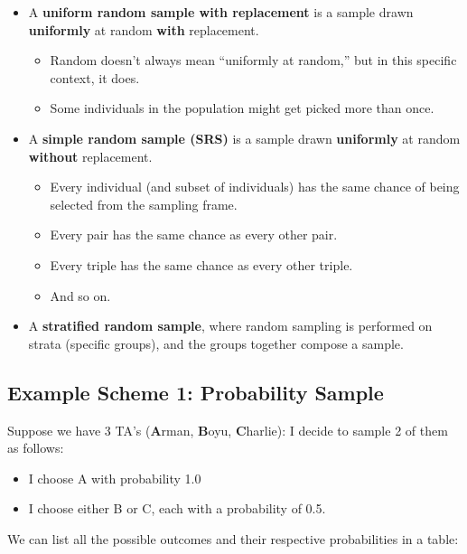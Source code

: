 \documentclass[
  letterpaper,
  DIV=11,
  numbers=noendperiod]{scrreprt}
\providecommand{\tightlist}{%
  \setlength{\itemsep}{0pt}\setlength{\parskip}{0pt}}\usepackage{longtable,booktabs,array}
\begin{document}
\begin{itemize}
\tightlist
\item
  A \textbf{uniform random sample with replacement} is a sample drawn
  \textbf{uniformly} at random \textbf{with} replacement.

  \begin{itemize}
  \tightlist
  \item
    Random doesn't always mean ``uniformly at random,'' but in this
    specific context, it does.
  \item
    Some individuals in the population might get picked more than once.
  \end{itemize}
\item
  A \textbf{simple random sample (SRS)} is a sample drawn
  \textbf{uniformly} at random \textbf{without} replacement.

  \begin{itemize}
  \tightlist
  \item
    Every individual (and subset of individuals) has the same chance of
    being selected from the sampling frame.
  \item
    Every pair has the same chance as every other pair.
  \item
    Every triple has the same chance as every other triple.
  \item
    And so on.
  \end{itemize}
\item
  A \textbf{stratified random sample}, where random sampling is
  performed on strata (specific groups), and the groups together compose
  a sample.
\end{itemize}

\subsection{Example Scheme 1: Probability
Sample}\label{example-scheme-1-probability-sample}

Suppose we have 3 TA's (\textbf{A}rman, \textbf{B}oyu,
\textbf{C}harlie): I decide to sample 2 of them as follows:

\begin{itemize}
\tightlist
\item
  I choose A with probability 1.0
\item
  I choose either B or C, each with a probability of 0.5.
\end{itemize}

We can list all the possible outcomes and their respective probabilities
in a table:
\end{document}

